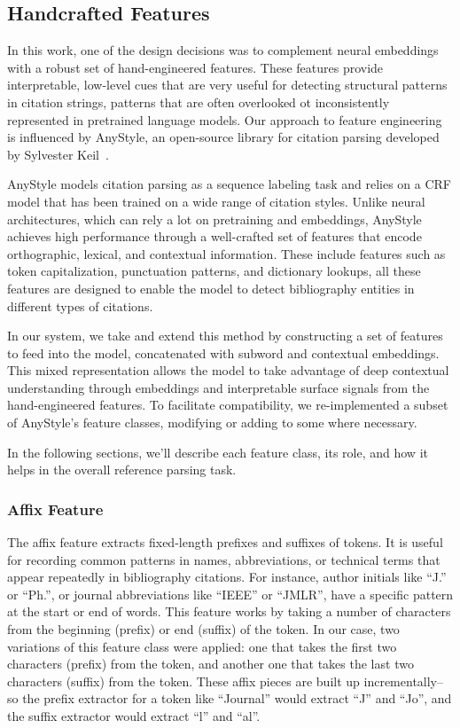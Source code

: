 \subsection{Handcrafted Features}
In this work, one of the design decisions was to complement neural embeddings with a robust set of hand-engineered features. These features provide interpretable, low-level cues that are very useful for detecting structural patterns in citation strings, patterns that are often overlooked ot inconsistently represented in pretrained language models. Our approach to feature engineering is influenced by AnyStyle, an open-source library for citation parsing developed by Sylvester Keil~\cite{anystyle}.

AnyStyle models citation parsing as a sequence labeling task and relies on a CRF model that has been trained on a wide range of citation styles. Unlike neural architectures, which can rely a lot on pretraining and embeddings, AnyStyle achieves high performance through a well-crafted set of features that encode orthographic, lexical, and contextual information.
These include features such as token capitalization, punctuation patterns, and dictionary lookups, all these features are designed to enable the model to detect bibliography entities in different types of citations.

In our system, we take and extend this method by constructing a set of features to feed into the model, concatenated with subword and contextual embeddings. This mixed representation allows the model to take advantage of deep contextual understanding through embeddings and interpretable surface signals from the hand-engineered features.
To facilitate compatibility, we re-implemented a subset of AnyStyle’s feature classes, modifying or adding to some where necessary.

In the following sections, we’ll describe each feature class, its role, and how it helps in the overall reference parsing task. 

\subsubsection{Affix Feature}
The affix feature extracts fixed-length prefixes and suffixes of tokens. It is useful for recording common patterns in names, abbreviations, or technical terms that appear repeatedly in bibliography citations. For instance, author initials like “J.” or “Ph.”, or journal abbreviations like “IEEE” or “JMLR”, have a specific pattern at the start or end of words.
This feature works by taking a number of characters from the beginning (prefix) or end (suffix) of the token. In our case, two variations of this feature class were applied: one that takes the first two characters (prefix) from the token, and another one that takes the last two characters (suffix) from the token. These affix pieces are built up incrementally–so the prefix extractor for a token like “Journal” would extract “J” and “Jo”, and the suffix extractor would extract “l” and “al”.

